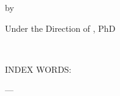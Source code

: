 \begin{center}
\parbox[]{\textwidth}{\centering\titlediss}
\end{center}
\vspace{0.4in}
\centerline{by}
\vspace*{0.5in}
\centerline{\writerUpper}
\vspace*{0.5in}
\centerline{Under the Direction of \chair, PhD}
\vspace{1.0in}
\begin{abstract}
  
\end{abstract}\\[0.5in]
\noindent \parbox[t]{0.25\textwidth}{ INDEX WORDS: } \hspace{3pt}
\parbox[t]{0.75\textwidth}{ \keywordOne --- \keywordTwo}